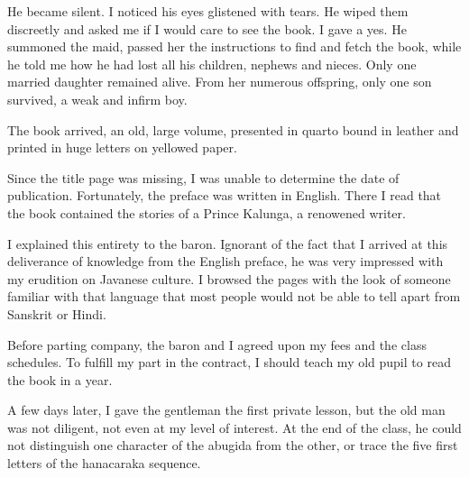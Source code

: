 \documentclass[a4paper,12pt]{book}
\begin{document}
He became silent. I noticed his eyes glistened
with tears.
He wiped them discreetly and asked me if I
would care to see the book. I gave a yes.
He summoned the maid, passed her the instructions
to find and fetch the book,
while he told me how he had lost all his children,
nephews and nieces. Only one married daughter
remained alive. From her numerous offspring,
only one son survived, a  weak and infirm boy.

The book arrived, an old,
large volume, presented in
quarto bound in leather and printed in huge
letters on yellowed paper.

Since the title page
was missing, I was unable to determine
the date of publication. Fortunately,
the preface was written
in English. There I read that the book
contained the stories of a Prince Kalunga,
a renowened writer.

I explained this entirety to the baron.
Ignorant of the fact that I arrived at 
this deliverance of knowledge
from the English preface, he was
very impressed with my erudition on
Javanese culture. I browsed the pages
with the look of someone familiar
with that language that most people
would not be able to tell apart from
Sanskrit or Hindi.

Before parting company, the baron and I
agreed upon my fees
and the class schedules.
To fulfill my part in the contract,
I should teach my old pupil to read
the book in a year.

A few days later, I gave the gentleman
the first private lesson, but the old man
was not diligent, not even at my level
of interest. At the
end of the class, he could not distinguish
one character of the abugida from the other,
or trace the five first letters of the
hanacaraka sequence.
\end{document}
